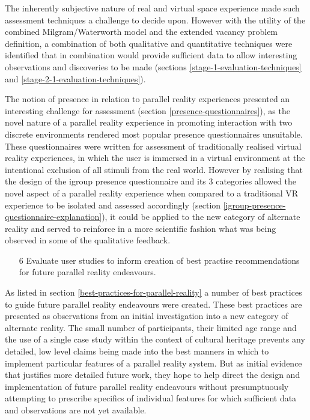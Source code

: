 The inherently subjective nature of real and virtual space experience made such assessment techniques a challenge to decide upon. However with the utility of the combined Milgram/Waterworth model and the extended vacancy problem definition, a combination of both qualitative and quantitative techniques were identified that in combination would provide sufficient data to allow interesting observations and discoveries to be made (sections \ref{stage-1-evaluation-techniques} and \ref{stage-2-1-evaluation-techniques}).

The notion of presence in relation to parallel reality experiences presented an interesting challenge for assessment (section \ref{presence-questionnaires}), as the novel nature of a parallel reality experience in promoting interaction with two discrete environments rendered most popular presence questionnaires unsuitable. These questionnaires were written for assessment of traditionally realised virtual reality experiences, in which the user is immersed in a virtual environment at the intentional exclusion of all stimuli from the real world. However by realising that the design of the igroup presence questionnaire and its 3 categories allowed the novel aspect of a parallel reality experience when compared to a traditional VR experience to be isolated and assessed accordingly (section \ref{igroup-presence-questionnaire-explanation}), it could be applied to the new category of alternate reality and served to reinforce in a more scientific fashion what was being observed in some of the qualitative feedback.

\begin{enumerate}
	\item[6] Evaluate user studies to inform creation of best practise recommendations for future parallel reality endeavours.
\end{enumerate}

As listed in section \ref{best-practices-for-parallel-reality} a number of best practices to guide future parallel reality endeavours were created. These best practices are presented as observations from an initial investigation into a new category of alternate reality. The small number of participants, their limited age range and the use of a single case study within the context of cultural heritage prevents any detailed, low level claims being made into the best manners in which to implement particular features of a parallel reality system. But as initial evidence that justifies more detailed future work, they hope to help direct the design and implementation of future parallel reality endeavours without presumptuously attempting to prescribe specifics of individual features for which sufficient data and observations are not yet available.

